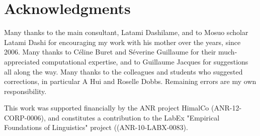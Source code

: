 	\section{Acknowledgments} \label{sec:ackno}

Many thanks to the main consultant, Latami Dashilame, and to Mosuo scholar Latami Dashi for encouraging my work with his mother over the years, since 2006. Many thanks to Céline Buret and Séverine Guillaume for their much-appreciated computational expertise, and to Guillaume Jacques for suggestions all along the way. Many thanks to the colleagues and students who suggested corrections, in particular A Hui and Roselle Dobbs. Remaining errors are my own responsibility. 

This work was supported financially by the ANR project HimalCo (ANR-12-CORP-0006), and constitutes a contribution to the LabEx "Empirical Foundations of Linguistics" project ((ANR-10-LABX-0083).

